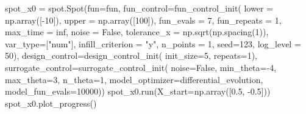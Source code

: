 \documentclass[
  letterpaper,
  DIV=11,
  numbers=noendperiod]{scrreprt}
\newenvironment{Shaded}{\begin{snugshade}}{\end{snugshade}}
\newcommand{\DecValTok}[1]{\textcolor[rgb]{0.68,0.00,0.00}{#1}}
\newcommand{\FloatTok}[1]{\textcolor[rgb]{0.68,0.00,0.00}{#1}}
\newcommand{\NormalTok}[1]{\textcolor[rgb]{0.00,0.23,0.31}{#1}}
\newcommand{\OperatorTok}[1]{\textcolor[rgb]{0.37,0.37,0.37}{#1}}
\newcommand{\StringTok}[1]{\textcolor[rgb]{0.13,0.47,0.30}{#1}}
\newcommand{\VariableTok}[1]{\textcolor[rgb]{0.07,0.07,0.07}{#1}}
\begin{document}
\begin{Shaded}
\begin{Highlighting}[]
\NormalTok{spot\_x0 }\OperatorTok{=}\NormalTok{ spot.Spot(fun}\OperatorTok{=}\NormalTok{fun,}
\NormalTok{                    fun\_control}\OperatorTok{=}\NormalTok{fun\_control\_init(}
\NormalTok{                        lower }\OperatorTok{=}\NormalTok{ np.array([}\OperatorTok{{-}}\DecValTok{10}\NormalTok{]),}
\NormalTok{                        upper }\OperatorTok{=}\NormalTok{ np.array([}\DecValTok{100}\NormalTok{]),}
\NormalTok{                        fun\_evals }\OperatorTok{=} \DecValTok{7}\NormalTok{,}
\NormalTok{                        fun\_repeats }\OperatorTok{=} \DecValTok{1}\NormalTok{,}
\NormalTok{                        max\_time }\OperatorTok{=}\NormalTok{ inf,}
\NormalTok{                        noise }\OperatorTok{=} \VariableTok{False}\NormalTok{,}
\NormalTok{                        tolerance\_x }\OperatorTok{=}\NormalTok{ np.sqrt(np.spacing(}\DecValTok{1}\NormalTok{)),}
\NormalTok{                        var\_type}\OperatorTok{=}\NormalTok{[}\StringTok{"num"}\NormalTok{],}
\NormalTok{                        infill\_criterion }\OperatorTok{=} \StringTok{"y"}\NormalTok{,}
\NormalTok{                        n\_points }\OperatorTok{=} \DecValTok{1}\NormalTok{,}
\NormalTok{                        seed}\OperatorTok{=}\DecValTok{123}\NormalTok{,}
\NormalTok{                        log\_level }\OperatorTok{=} \DecValTok{50}\NormalTok{),}
\NormalTok{                    design\_control}\OperatorTok{=}\NormalTok{design\_control\_init(}
\NormalTok{                        init\_size}\OperatorTok{=}\DecValTok{5}\NormalTok{,}
\NormalTok{                        repeats}\OperatorTok{=}\DecValTok{1}\NormalTok{),}
\NormalTok{                    surrogate\_control}\OperatorTok{=}\NormalTok{surrogate\_control\_init(}
\NormalTok{                        noise}\OperatorTok{=}\VariableTok{False}\NormalTok{,}
\NormalTok{                        min\_theta}\OperatorTok{={-}}\DecValTok{4}\NormalTok{,}
\NormalTok{                        max\_theta}\OperatorTok{=}\DecValTok{3}\NormalTok{,}
\NormalTok{                        n\_theta}\OperatorTok{=}\DecValTok{1}\NormalTok{,}
\NormalTok{                        model\_optimizer}\OperatorTok{=}\NormalTok{differential\_evolution,}
\NormalTok{                        model\_fun\_evals}\OperatorTok{=}\DecValTok{10000}\NormalTok{))}
\NormalTok{spot\_x0.run(X\_start}\OperatorTok{=}\NormalTok{np.array([}\FloatTok{0.5}\NormalTok{, }\OperatorTok{{-}}\FloatTok{0.5}\NormalTok{]))}
\NormalTok{spot\_x0.plot\_progress()}
\end{Highlighting}
\end{Shaded}
\end{document}
